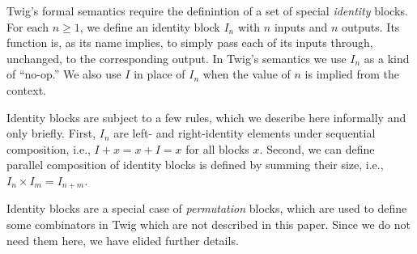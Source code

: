 Twig's formal semantics require the definintion of a set of special \emph{identity} blocks. For each $n \geq 1$, we define an identity block $I_n$ with $n$ inputs and $n$ outputs. Its function is, as its name implies, to simply pass each of its inputs through, unchanged, to the corresponding output. In Twig's semantics we use $I_n$ as a kind of ``no-op.'' We also use $I$ in place of $I_n$ when the value of $n$ is implied from the context.

Identity blocks are subject to a few rules, which we describe here informally and only briefly. First, $I_n$ are left- and right-identity elements under sequential composition, i.e., $I + x = x + I = x$ for all blocks $x$. Second, we can define parallel composition of identity blocks is defined by summing their size, i.e., $I_n \times I_m = I_{n + m}$.

Identity blocks are a special case of \emph{permutation} blocks, which are used to define some combinators in Twig which are not described in this paper. Since we do not need them here, we have elided further details.
